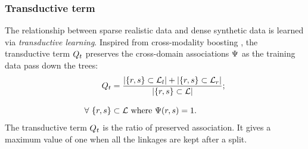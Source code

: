 \subsubsection{Transductive term} 
The relationship between sparse realistic data and dense synthetic data is learned via \emph{transductive learning}. Inspired from cross-modality boosting \cite{Bronstein2010}, the transductive term $Q_{t}$ preserves the cross-domain associations $\mathrm{\Psi}$ as the training data pass down the trees: 
\begin{equation}
	\begin{split}
		Q_{t} &= 
		\frac{|\{r,s\} \subset \mathcal{L}_{l}| +  
		|\{r,s\} \subset \mathcal{L}_{r}|}{|\{r,s\} \subset \mathcal{L}|}; \\[3mm]   
		\forall\ \{r,s\} & \subset \mathcal{L} \mbox{ where } \mathrm{\Psi}(r,s) = 1.
	\end{split}
\end{equation}
The transductive term $Q_{t}$ is the ratio of preserved association. It gives a maximum value of one when all the linkages are kept after a split.   

